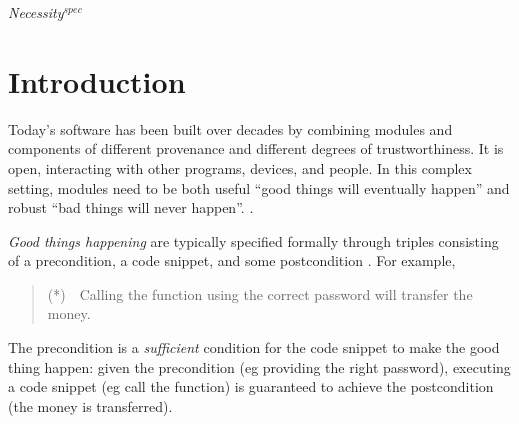 \newcommand{\sophiaPonder}[2][]{\ponders{Sophia}{blue}{#1} \textcolor{blue}{#2}\xspace}
\renewcommand{\sophia}[2][]


\renewcommand{\Chainmail}{\textit{Necessity}$^{spec}$\xspace}  
\newcommand{\Chainspec}{\textit{Necessity}$^{spec}$\xspace}
\newcommand{\Chainlogic}{\textit{Necessity}$^{logic}$\xspace}
\newcommand{\NecessitySpecifications}{Necessity Specifications\xspace}
\newcommand{\NecessitySpecification}{Necessity Specification\xspace}
\renewcommand{\SpecO}{\textit{Basic}$^{spec}$\xspace}  
\renewcommand{\Loo}{\textit{Lang}$^{oo}$\xspace}

\section{Introduction}

Today's   software has been built 
over decades by combining modules and components of
different provenance and different degrees of trustworthiness. It 
is open, interacting with other programs, devices, and people.
In this complex setting, modules need to be both useful ``good things
will eventually happen'' and robust 
``bad things will never happen''. %
\cite{Lamport77}. 
 
  \vspace{.03in}
\emph{Good things happening} are typically specified formally 
 through triples consisting of a  precondition, a code snippet, and some
 postcondition \cite{Hoare69}.
 For example,
 \begin{quote}
(*)\  \ Calling the  function  using the correct 
 password will transfer the money.
\end{quote}
  The precondition is a \emph{sufficient} condition for the code snippet to
make the good thing happen: given the precondition (eg providing the right 
password), executing a
code snippet (eg call  the  function) 
is guaranteed to achieve the postcondition (the money is transferred).

